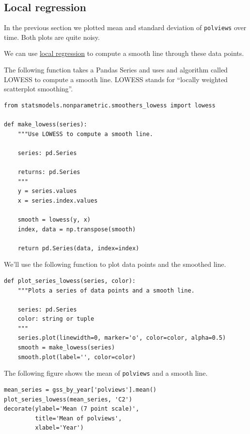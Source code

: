 \hypertarget{local-regression}{%
\subsection{Local regression}\label{local-regression}}

In the previous section we plotted mean and standard deviation of
\passthrough{\lstinline!polviews!} over time. Both plots are quite
noisy.

We can use \href{https://en.wikipedia.org/wiki/Local_regression}{local
regression} to compute a smooth line through these data points.

The following function takes a Pandas Series and uses and algorithm
called LOWESS to compute a smooth line. LOWESS stands for ``locally
weighted scatterplot smoothing''.

\begin{lstlisting}[]
from statsmodels.nonparametric.smoothers_lowess import lowess

def make_lowess(series):
    """Use LOWESS to compute a smooth line.
    
    series: pd.Series
    
    returns: pd.Series
    """
    y = series.values
    x = series.index.values

    smooth = lowess(y, x)
    index, data = np.transpose(smooth)

    return pd.Series(data, index=index) 
\end{lstlisting}

We'll use the following function to plot data points and the smoothed
line.

\begin{lstlisting}[]
def plot_series_lowess(series, color):
    """Plots a series of data points and a smooth line.
    
    series: pd.Series
    color: string or tuple
    """
    series.plot(linewidth=0, marker='o', color=color, alpha=0.5)
    smooth = make_lowess(series)
    smooth.plot(label='', color=color)
\end{lstlisting}

The following figure shows the mean of
\passthrough{\lstinline!polviews!} and a smooth line.

\begin{lstlisting}[]
mean_series = gss_by_year['polviews'].mean()
plot_series_lowess(mean_series, 'C2')
decorate(ylabel='Mean (7 point scale)',
         title='Mean of polviews',
         xlabel='Year')
\end{lstlisting}

